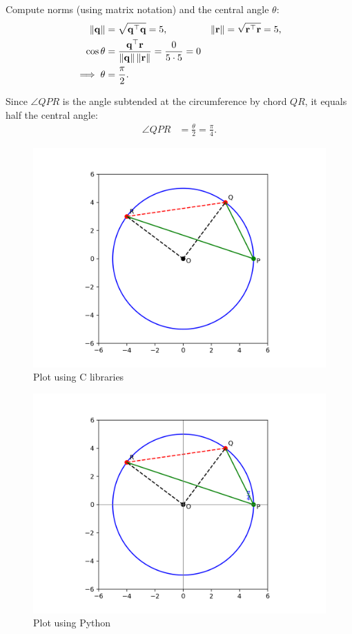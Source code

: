\documentclass{beamer}
\numberwithin{equation}{section}
\begin{document}
Compute norms (using matrix notation) and the central angle $\theta$:
\begin{align}
\left\lVert\mathbf{q}\right\rVert &= \sqrt{\mathbf{q}^\top\mathbf{q}} = 5, & 
\left\lVert\mathbf{r}\right\rVert &= \sqrt{\mathbf{r}^\top\mathbf{r}} = 5, \\
\cos\theta &= \dfrac{\mathbf{q}^\top\mathbf{r}}{\left\lVert\mathbf{q}\right\rVert\left\lVert\mathbf{r}\right\rVert}
= \dfrac{0}{5\cdot 5} = 0 \\
\implies \theta &= \frac{\pi}{2}.
\end{align}

Since $\angle QPR$ is the angle subtended at the circumference by chord $QR$, it equals half the central angle:
\begin{align}
\angle QPR &= \frac{\theta}{2} = \frac{\pi}{4}.
\end{align}

\begin{figure}[H]
	\centering
	\includegraphics[scale=0.25]{img1}
	\caption*{Plot using C libraries}
	\label{img1}
\end{figure}
\begin{figure}[H]
	\centering
	\includegraphics[scale=0.25]{img2}
	\caption*{Plot using Python}
	\label{img2}
\end{figure}
\end{document}
